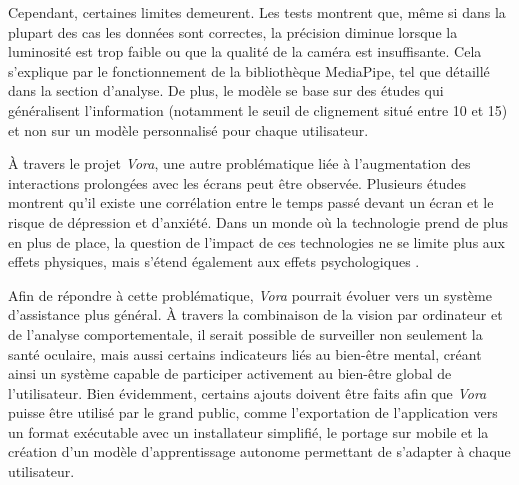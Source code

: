 \documentclass{rapportbrebeuf}
\begin{document}
Cependant, certaines limites demeurent. Les tests montrent que, même si dans la plupart des cas les données sont correctes, la précision diminue lorsque la luminosité est trop faible ou que la qualité de la caméra est insuffisante. Cela s’explique par le fonctionnement de la bibliothèque MediaPipe, tel que détaillé dans la section d'analyse. De plus, le modèle se base sur des études qui généralisent l’information (notamment le seuil de clignement situé entre 10 et 15) et non sur un modèle personnalisé pour chaque utilisateur. 

À travers le projet \textit{Vora}, une autre problématique liée à l’augmentation des interactions prolongées avec les écrans peut être observée. Plusieurs études montrent qu’il existe une corrélation entre le temps passé devant un écran et le risque de dépression et d’anxiété. Dans un monde où la technologie prend de plus en plus de place, la question de l’impact de ces technologies ne se limite plus aux effets physiques, mais s’étend également aux effets psychologiques \cite{li2022depression}. 

Afin de répondre à cette problématique, \textit{Vora} pourrait évoluer vers un système d’assistance plus général. À travers la combinaison de la vision par ordinateur et de l’analyse comportementale, il serait possible de surveiller non seulement la santé oculaire, mais aussi certains indicateurs liés au bien-être mental, créant ainsi un système capable de participer activement au bien-être global de l’utilisateur. Bien évidemment, certains ajouts doivent être faits afin que \textit{Vora} puisse être utilisé par le grand public, comme l'exportation de l’application vers un format exécutable avec un installateur simplifié, le portage sur mobile et la création d’un modèle d’apprentissage autonome permettant de s’adapter à chaque utilisateur.

\newpage
\nocite{girard2026vora}
\nocite{bulat2017alignment}
\nocite{ibm2021cnn}
\nocite{bytequest2025cnn}
\nocite{bryce2022resnet}
\nocite{3b1b2017backprop}
\nocite{bytequest2025gradient}
\nocite{devhutt2021vanishing}
\nocite{sandhu2025resnet}
\printbibliography

\newpage
\pagestyle{fancy}
\fancyhf{}
\renewcommand{\headrulewidth}{0pt}
\end{document}
